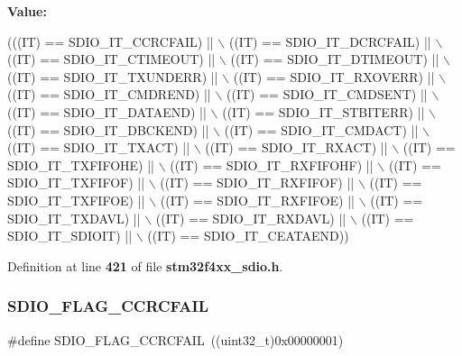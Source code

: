 {\bfseries Value\+:}
\begin{DoxyCode}
(((IT)  == SDIO_IT_CCRCFAIL) || \(\backslash\)
                            ((IT)  == SDIO_IT_DCRCFAIL) || \(\backslash\)
                            ((IT)  == SDIO_IT_CTIMEOUT) || \(\backslash\)
                            ((IT)  == SDIO_IT_DTIMEOUT) || \(\backslash\)
                            ((IT)  == SDIO_IT_TXUNDERR) || \(\backslash\)
                            ((IT)  == SDIO_IT_RXOVERR) || \(\backslash\)
                            ((IT)  == SDIO_IT_CMDREND) || \(\backslash\)
                            ((IT)  == SDIO_IT_CMDSENT) || \(\backslash\)
                            ((IT)  == SDIO_IT_DATAEND) || \(\backslash\)
                            ((IT)  == SDIO_IT_STBITERR) || \(\backslash\)
                            ((IT)  == SDIO_IT_DBCKEND) || \(\backslash\)
                            ((IT)  == SDIO_IT_CMDACT) || \(\backslash\)
                            ((IT)  == SDIO_IT_TXACT) || \(\backslash\)
                            ((IT)  == SDIO_IT_RXACT) || \(\backslash\)
                            ((IT)  == SDIO_IT_TXFIFOHE) || \(\backslash\)
                            ((IT)  == SDIO_IT_RXFIFOHF) || \(\backslash\)
                            ((IT)  == SDIO_IT_TXFIFOF) || \(\backslash\)
                            ((IT)  == SDIO_IT_RXFIFOF) || \(\backslash\)
                            ((IT)  == SDIO_IT_TXFIFOE) || \(\backslash\)
                            ((IT)  == SDIO_IT_RXFIFOE) || \(\backslash\)
                            ((IT)  == SDIO_IT_TXDAVL) || \(\backslash\)
                            ((IT)  == SDIO_IT_RXDAVL) || \(\backslash\)
                            ((IT)  == SDIO_IT_SDIOIT) || \(\backslash\)
                            ((IT)  == SDIO_IT_CEATAEND))
\end{DoxyCode}


Definition at line \textbf{ 421} of file \textbf{ stm32f4xx\+\_\+sdio.\+h}.

\mbox{\label{group__SDIO__Flags_ga8ff1f3960378e05ec3c949940e1c49d0}} 
\subsubsection{S\+D\+I\+O\+\_\+\+F\+L\+A\+G\+\_\+\+C\+C\+R\+C\+F\+A\+IL}
{\footnotesize\ttfamily \#define S\+D\+I\+O\+\_\+\+F\+L\+A\+G\+\_\+\+C\+C\+R\+C\+F\+A\+IL~((uint32\+\_\+t)0x00000001)}



